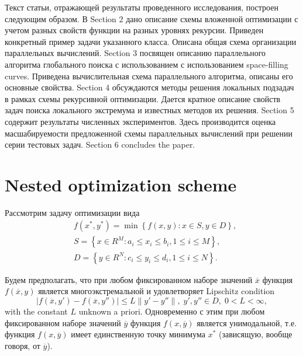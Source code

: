 \documentclass{svproc}
\begin{document}
Текст статьи, отражающей результаты проведенного исследования, построен следующим образом. 
В Section 2 дано описание схемы вложенной оптимизации с учетом разных свойств функции на разных уровнях рекурсии. Приведен конкретный пример задачи указанного класса. Описана общая схема организации параллельных вычислений. 
Section 3 посвящен описанию параллельного алгоритма глобального поиска с использованием с использованием space-filling curves. Приведена вычислительная схема параллельного алгоритма, описаны его основные свойства.
Section 4 обсуждаются методы решения локальных подзадач в рамках схемы рекурсивной оптимизации. Дается кратное описание свойств задач поиска локального экстремума и известных методов их решения. 
Section 5 содержит результаты численных экспериментов. Здесь производится оценка масшабируемости предложенной схемы параллельных вычислений при решении серии тестовых задач.  
Section 6 concludes the paper.


\section{Nested optimization scheme}

Рассмотрим задачу оптимизации вида
\begin{eqnarray}\label{main_problem}
& f(x^\ast,y^\ast)=\min{\left\{f(x,y):x\in S, y\in D\right\}}, \nonumber \\
& S=\left\{x\in R^M: a_i\leq x_i \leq b_i, 1\leq i \leq M\right\}, \\
& D=\left\{y\in R^N: c_i\leq y_i \leq d_i, 1\leq i \leq N\right\}. \nonumber
\end{eqnarray}

Будем предполагать, что при любом фиксированном наборе значений $\overline{x}$ функция $f(\overline{x},y)$ является многоэкстремальной и удовлетворяет Lipschitz condition
\[
\left|f(\overline{x},y')-f(\overline{x},y'')\right|\leq L\left\|y'-y''\right\|,\; y',y'' \in D,\; 0<L<\infty,
\]
with the constant $L$ unknown a priori.
Одновременно с этим при любом фиксированном наборе значений $\overline{y}$  функция $f(x,\overline{y})$ является унимодальной, т.е. функция $f(x,\overline{y})$ имеет единственную точку минимума $x^*$ (зависящую, вообще говоря, от $\overline{y}$). 
\end{document}
